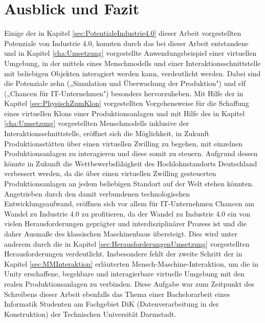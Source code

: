 \chapter{Ausblick und Fazit}\label{cha:AusblickUndFazit}

Einige der in Kapitel \ref{sec:PotentialeIndustrie4.0} dieser Arbeit vorgestellten Potenziale von Industrie 4.0, konnten durch das bei dieser Arbeit entstandene und in Kapitel \ref{cha:Umsetzung} vorgestellte Anwendungsbeispiel einer virtuellen Umgebung, in der mittels eines Menschmodells und einer Interaktionsschnittstelle mit beliebigen Objekten interagiert werden kann, verdeutlicht werden. Dabei sind die Potenziale zehn („Simulation und Überwachung der Produktion") und elf („Chancen für IT-Unternehmen") besonders hervorzuheben.
\newline
Mit Hilfe der in Kapitel \ref{sec:PhysischZumKlon} vorgestellten Vorgehensweise für die Schaffung eines virtuellen Klons einer Produktionsanlagen und mit Hilfe des in Kapitel \ref{cha:Umsetzung} vorgestellten Menschmodells inklusive der Interaktionsschnittstelle, eröffnet sich die Möglichkeit, in Zukunft Produktionsstätten über einen virtuellen Zwilling zu begehen, mit einzelnen Produktionsanlagen zu interagieren und diese somit zu steuern. Aufgrund dessen könnte in Zukunft die Wettbewerbsfähigkeit des Hochlohnstandorts Deutschland verbessert werden, da die über einen virtuellen Zwilling gesteuerten Produktionsanlagen an jedem beliebigen Standort auf der Welt stehen könnten.
\newline
Angetrieben durch den damit verbundenen technologischen Entwicklungsaufwand, eröffnen sich vor allem für IT-Unternehmen Chancen am Wandel zu Industrie 4.0 zu profitieren, da der Wandel zu Industrie 4.0 ein von vielen Herausforderungen geprägter und interdisziplinärer Prozess ist und die daher Ausmaße des klassischen Maschinenbaus übersteigt. Dies wird unter anderem durch die in Kapitel \ref{sec:HerausforderungenUmsetzung} vorgestellten Herausforderungen verdeutlicht. Insbesondere fehlt der zweite Schritt der in Kapitel \ref{sec:MMInteraktion} erläuterten Mensch-Maschine-Interaktion, um die in Unity erschaffene, begehbare und interagierbare virtuelle Umgebung mit den realen Produktionsanlagen zu verbinden. Diese Aufgabe war zum Zeitpunkt des Schreibens dieser Arbeit ebenfalls das Thema einer Bachelorarbeit eines Informatik Studenten am Fachgebiet DiK (Datenverarbeitung in der Konstruktion) der Technischen Universität Darmstadt.

